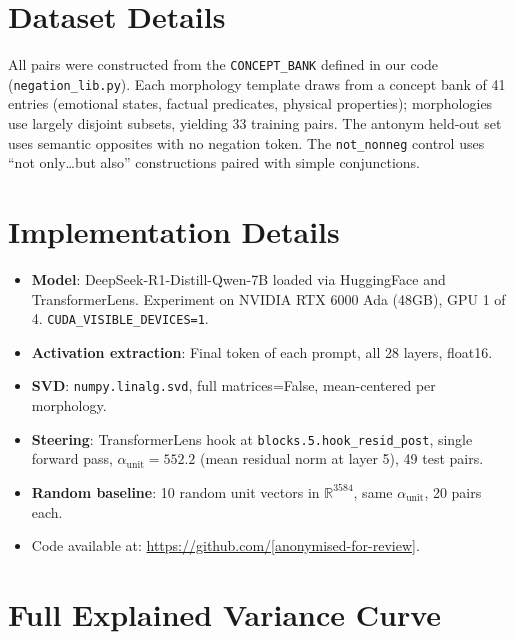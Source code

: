 \documentclass{article}
\begin{document}



\appendix

\section{Dataset Details}
\label{app:data}

All pairs were constructed from the \texttt{CONCEPT\_BANK} defined in our code (\texttt{negation\_lib.py}).
Each morphology template draws from a concept bank of 41 entries (emotional states, factual predicates, physical properties); morphologies use largely disjoint subsets, yielding 33 training pairs.
The antonym held-out set uses semantic opposites with no negation token.
The \texttt{not\_nonneg} control uses ``not only\ldots but also'' constructions paired with simple conjunctions.

\section{Implementation Details}
\label{app:impl}

\begin{itemize}
  \item \textbf{Model}: DeepSeek-R1-Distill-Qwen-7B loaded via HuggingFace and TransformerLens.
        Experiment on NVIDIA RTX 6000 Ada (48GB), GPU 1 of 4.
        \texttt{CUDA\_VISIBLE\_DEVICES=1}.
  \item \textbf{Activation extraction}: Final token of each prompt, all 28 layers, float16.
  \item \textbf{SVD}: \texttt{numpy.linalg.svd}, full matrices=False, mean-centered per morphology.
  \item \textbf{Steering}: TransformerLens hook at \texttt{blocks.5.hook\_resid\_post}, single forward pass,
        $\alpha_{\text{unit}} = 552.2$ (mean residual norm at layer 5), 49 test pairs.
  \item \textbf{Random baseline}: 10 random unit vectors in $\mathbb{R}^{3584}$, same $\alpha_{\text{unit}}$, 20 pairs each.
  \item Code available at: \url{https://github.com/[anonymised-for-review]}.
\end{itemize}

\section{Full Explained Variance Curve}
\label{app:ev}
\end{document}
